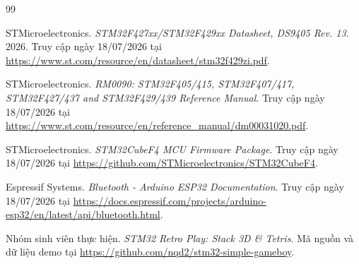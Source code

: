 \begin{thebibliography}{99}
\raggedright
{}

STMicroelectronics. \textit{STM32F427xx/STM32F429xx Datasheet, DS9405 Rev. 13}. 2026. Truy cập ngày 18/07/2026 tại \url{https://www.st.com/resource/en/datasheet/stm32f429zi.pdf}.

STMicroelectronics. \textit{RM0090: STM32F405/415, STM32F407/417, STM32F427/437 and STM32F429/439 Reference Manual}. Truy cập ngày 18/07/2026 tại \url{https://www.st.com/resource/en/reference_manual/dm00031020.pdf}.

STMicroelectronics. \textit{STM32CubeF4 MCU Firmware Package}. Truy cập ngày 18/07/2026 tại \url{https://github.com/STMicroelectronics/STM32CubeF4}.

Espressif Systems. \textit{Bluetooth - Arduino ESP32 Documentation}. Truy cập ngày 18/07/2026 tại \url{https://docs.espressif.com/projects/arduino-esp32/en/latest/api/bluetooth.html}.

Nhóm sinh viên thực hiện. \textit{STM32 Retro Play: Stack 3D \& Tetris}. Mã nguồn và dữ liệu demo tại \url{https://github.com/nqd2/stm32-simple-gameboy}.

\end{thebibliography}

